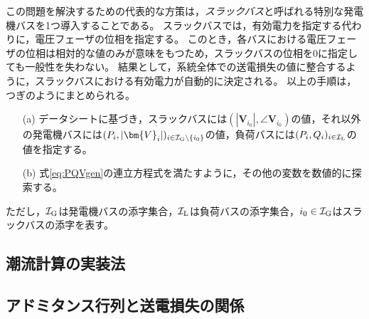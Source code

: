 \documentclass[tombow,dvipdfmx]{corona-a5}
\begin{document}
この問題を解決するための代表的な方策は，\emph{スラックバス}と呼ばれる特別な発電機バスを1つ導入することである。
スラックバスでは，有効電力を指定する代わりに，電圧フェーザの位相を指定する。
このとき，各バスにおける電圧フェーザの位相は相対的な値のみが意味をもつため，スラックバスの位相を0に指定しても一般性を失わない。
結果として，系統全体での送電損失の値に整合するように，スラックバスにおける有効電力が自動的に決定される。
以上の手順は，つぎのようにまとめられる。
\begin{itemize}
\item[(a)] データシートに基づき，スラックバスには$(|\bm{V}_{i_0}|,\angle \bm{V}_{i_0})$の値，それ以外の発電機バスには$(P_i,|\bm{V}_{i}|)_{i \in \mathcal{I}_{\rm G}\setminus\{i_0\} }$の値，負荷バスには$(P_i,Q_i)_{i \in \mathcal{I}_{\rm L}}$の値を指定する。
\item[(b)] 式\ref{eq:PQVgen}の連立方程式を満たすように，その他の変数を数値的に探索する。
\end{itemize}
ただし，$\mathcal{I}_{\rm G}$は発電機バスの添字集合，$\mathcal{I}_{\rm L}$は負荷バスの添字集合，$i_0 \in \mathcal{I}_{\rm G}$はスラックバスの添字を表す。


\begin{例}[データシートに基づく潮流計算]
\end{例}



\begin{例}[経済性を考慮した潮流計算]\label{ex:pflow}
\end{例}


\subsection{潮流計算の実装法}


\subsection{アドミタンス行列と送電損失の関係\advanced}
\end{document}
